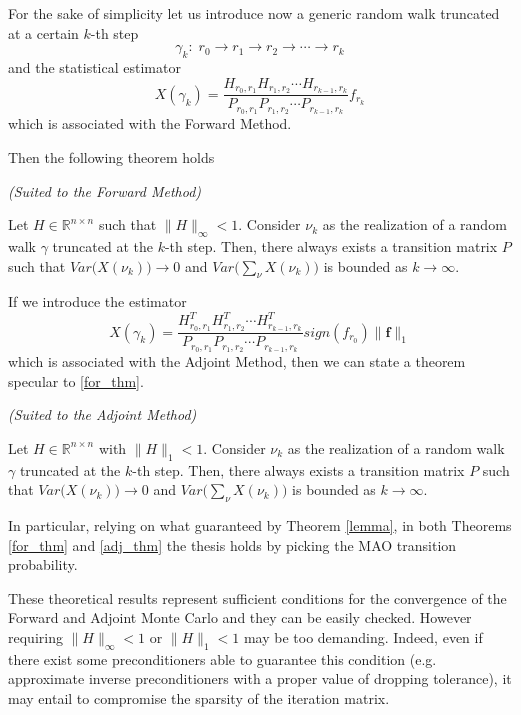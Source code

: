 For the sake of simplicity let us introduce now a generic random walk
truncated at a certain $k$-th step
\[
 \gamma_k:\; r_0\rightarrow r_1 \rightarrow r_2 \rightarrow \cdots \rightarrow
r_k
\]
and the statistical estimator
\[
 X(\gamma_k)=\frac{H_{r_0,r_1}H_{r_1,r_2}\cdots
H_{r_{k-1},r_k}}{P_{r_0,r_1}P_{r_1,r_2}\cdots P_{r_{k-1},r_k}}f_{r_k}
\]
which is associated with the Forward Method.

Then the following theorem holds
\begin{thm}\textit{(Suited to the Forward Method)}

Let $H\in \mathbb{R}^{n\times n}$ such that $\lVert H\rVert_{\infty}<1$.
Consider $\nu_k$ as the realization of a random walk $\gamma$ truncated at the
$k$-th step. Then,
there always exists a
transition matrix $P$ such that
$Var\Big(X(\nu_k)\Big)\rightarrow 0$ and
$Var\Big(\sum_{\nu}X(\nu_k)\Big)$ is bounded as $k\rightarrow \infty$.
\label{for_thm}
\end{thm}

If we introduce the estimator
\[
 X(\gamma_k)=\frac{H^T_{r_0,r_1}H^T_{r_1,r_2}\cdots
H^T_{r_{k-1},r_k}}{P_{r_0,r_1}P_{r_1,r_2}\cdots
P_{r_{k-1},r_k}}sign(f_{r_0})\lVert \mathbf{f}\rVert_1
\]
which is associated with the Adjoint Method, then we can state a
theorem specular to \ref{for_thm}.

\begin{thm}\textit{(Suited to the Adjoint Method)}

 Let $H\in \mathbb{R}^{n\times n}$ with $\lVert H\rVert_{1}<1$.
Consider $\nu_k$ as the realization of a random walk $\gamma$ truncated at the
$k$-th step. Then,
there always exists a
transition matrix $P$ such that
$Var\Big(X(\nu_k)\Big)\rightarrow 0$ and
$Var\Big(\sum_{\nu}X(\nu_k)\Big)$ is bounded as $k\rightarrow \infty$.
\label{adj_thm}
\end{thm}

In particular, relying on what guaranteed by Theorem \ref{lemma}, in both
Theorems \ref{for_thm} and \ref{adj_thm} the thesis holds by picking the MAO
transition probability.

These theoretical results represent sufficient conditions for the convergence
of the
Forward and Adjoint Monte Carlo and they can be easily checked.
However requiring $\lVert
H\rVert_{\infty}<1$ or $\lVert H\rVert_1<1$ may be too demanding.
Indeed, even if there exist some preconditioners able to guarantee this
condition (e.g. approximate inverse preconditioners with a proper value of
dropping
tolerance), it may entail to compromise the sparsity of the
iteration
matrix.

